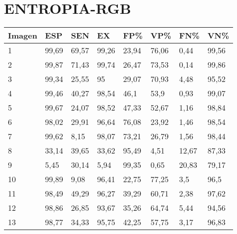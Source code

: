 \section{ENTROPIA-RGB}
\begin{longtable}[c]{|l|l|l|l|l|l|l|l|}
\hline
\textbf{Imagen} & \textbf{ESP} & \textbf{SEN} & \textbf{EX} & \textbf{FP\%} & \textbf{VP\%} & \textbf{FN\%} & \textbf{VN\%} \\ \hline
\endfirsthead
%
\endhead
%
1               & 99,69        & 69,57        & 99,26       & 23,94         & 76,06         & 0,44          & 99,56         \\ \hline
2               & 99,87        & 71,43        & 99,74       & 26,47         & 73,53         & 0,14          & 99,86         \\ \hline
3               & 99,34        & 25,55        & 95          & 29,07         & 70,93         & 4,48          & 95,52         \\ \hline
4               & 99,46        & 40,27        & 98,54       & 46,1          & 53,9          & 0,93          & 99,07         \\ \hline
5               & 99,67        & 24,07        & 98,52       & 47,33         & 52,67         & 1,16          & 98,84         \\ \hline
6               & 98,02        & 29,91        & 96,64       & 76,08         & 23,92         & 1,46          & 98,54         \\ \hline
7               & 99,62        & 8,15         & 98,07       & 73,21         & 26,79         & 1,56          & 98,44         \\ \hline
8               & 33,14        & 39,65        & 33,62       & 95,49         & 4,51          & 12,67         & 87,33         \\ \hline
9               & 5,45         & 30,14        & 5,94        & 99,35         & 0,65          & 20,83         & 79,17         \\ \hline
10              & 99,89        & 9,08         & 96,41       & 22,75         & 77,25         & 3,5           & 96,5          \\ \hline
11              & 98,49        & 49,29        & 96,27       & 39,29         & 60,71         & 2,38          & 97,62         \\ \hline
12              & 98,86        & 26,85        & 93,67       & 35,26         & 64,74         & 5,44          & 94,56         \\ \hline
13              & 98,77        & 34,33        & 95,75       & 42,25         & 57,75         & 3,17          & 96,83         \\ \hline

\end{longtable}
